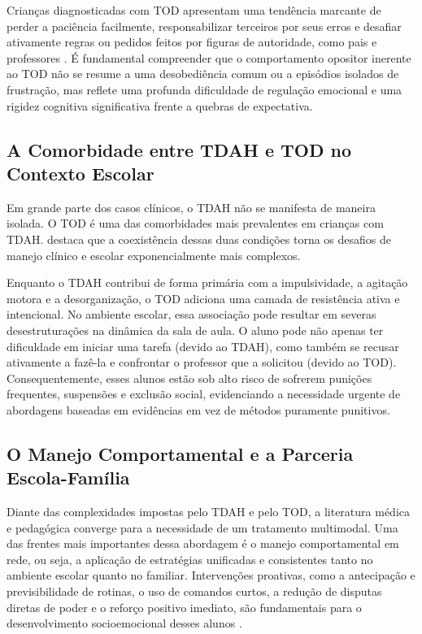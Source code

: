 Crianças diagnosticadas com TOD apresentam uma tendência marcante de perder a paciência facilmente, responsabilizar terceiros por seus erros e desafiar ativamente regras ou pedidos feitos por figuras de autoridade, como pais e professores \cite{barkley2015}. É fundamental compreender que o comportamento opositor inerente ao TOD não se resume a uma desobediência comum ou a episódios isolados de frustração, mas reflete uma profunda dificuldade de regulação emocional e uma rigidez cognitiva significativa frente a quebras de expectativa.

\subsection{A Comorbidade entre TDAH e TOD no Contexto Escolar}

Em grande parte dos casos clínicos, o TDAH não se manifesta de maneira isolada. O TOD é uma das comorbidades mais prevalentes em crianças com TDAH.  destaca que a coexistência dessas duas condições torna os desafios de manejo clínico e escolar exponencialmente mais complexos. 

Enquanto o TDAH contribui de forma primária com a impulsividade, a agitação motora e a desorganização, o TOD adiciona uma camada de resistência ativa e intencional. No ambiente escolar, essa associação pode resultar em severas desestruturações na dinâmica da sala de aula. O aluno pode não apenas ter dificuldade em iniciar uma tarefa (devido ao TDAH), como também se recusar ativamente a fazê-la e confrontar o professor que a solicitou (devido ao TOD). Consequentemente, esses alunos estão sob alto risco de sofrerem punições frequentes, suspensões e exclusão social, evidenciando a necessidade urgente de abordagens baseadas em evidências em vez de métodos puramente punitivos.

\subsection{O Manejo Comportamental e a Parceria Escola-Família}

Diante das complexidades impostas pelo TDAH e pelo TOD, a literatura médica e pedagógica converge para a necessidade de um tratamento multimodal. Uma das frentes mais importantes dessa abordagem é o manejo comportamental em rede, ou seja, a aplicação de estratégias unificadas e consistentes tanto no ambiente escolar quanto no familiar. Intervenções proativas, como a antecipação e previsibilidade de rotinas, o uso de comandos curtos, a redução de disputas diretas de poder e o reforço positivo imediato, são fundamentais para o desenvolvimento socioemocional desses alunos \cite{mattos2003}.

